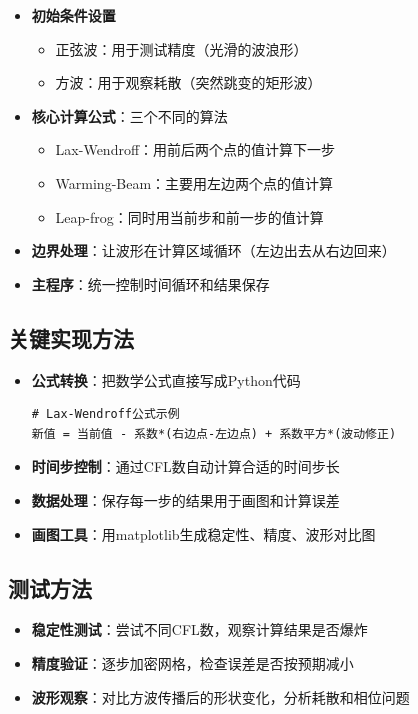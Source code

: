 \documentclass[UTF8]{ctexart}
\begin{document}
\begin{itemize}
    \item \textbf{初始条件设置}
    \begin{itemize}
        \item 正弦波：用于测试精度（光滑的波浪形）
        \item 方波：用于观察耗散（突然跳变的矩形波）
    \end{itemize}
    
    \item \textbf{核心计算公式}：三个不同的算法
    \begin{itemize}
        \item Lax-Wendroff：用前后两个点的值计算下一步
        \item Warming-Beam：主要用左边两个点的值计算
        \item Leap-frog：同时用当前步和前一步的值计算
    \end{itemize}
    
    \item \textbf{边界处理}：让波形在计算区域循环（左边出去从右边回来）
    \item \textbf{主程序}：统一控制时间循环和结果保存
\end{itemize}

\subsection{关键实现方法}
\begin{itemize}
    \item \textbf{公式转换}：把数学公式直接写成Python代码
    \begin{verbatim}
# Lax-Wendroff公式示例
新值 = 当前值 - 系数*(右边点-左边点) + 系数平方*(波动修正)
    \end{verbatim}
    
    \item \textbf{时间步控制}：通过CFL数自动计算合适的时间步长
    \item \textbf{数据处理}：保存每一步的结果用于画图和计算误差
    \item \textbf{画图工具}：用matplotlib生成稳定性、精度、波形对比图
\end{itemize}

\subsection{测试方法}
\begin{itemize}
    \item \textbf{稳定性测试}：尝试不同CFL数，观察计算结果是否爆炸
    \item \textbf{精度验证}：逐步加密网格，检查误差是否按预期减小
    \item \textbf{波形观察}：对比方波传播后的形状变化，分析耗散和相位问题
\end{itemize}
\end{document}
